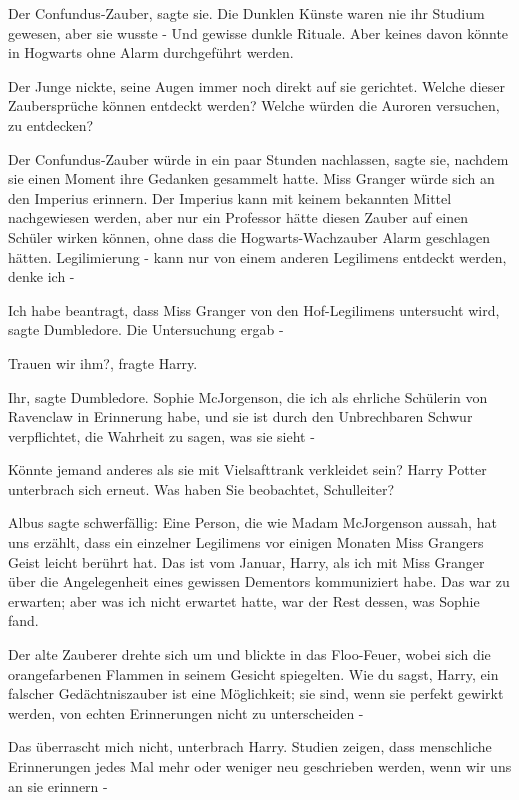 \glqq{}Der Confundus-Zauber\grqq{}, sagte sie. Die Dunklen Künste waren nie ihr
Studium gewesen, aber sie wusste - \glqq{}Und gewisse dunkle Rituale. Aber keines
davon könnte in Hogwarts ohne Alarm durchgeführt werden.\grqq{}

Der Junge nickte, seine Augen immer noch direkt auf sie gerichtet. \glqq{}Welche
dieser Zaubersprüche können entdeckt werden? Welche würden die Auroren
versuchen, zu entdecken?\grqq{}

\glqq{}Der Confundus-Zauber würde in ein paar Stunden nachlassen\grqq{}, sagte
sie, nachdem sie einen Moment ihre Gedanken gesammelt hatte. \glqq{}Miss Granger
würde sich an den Imperius erinnern. Der Imperius kann mit keinem bekannten
Mittel nachgewiesen werden, aber nur ein Professor hätte diesen Zauber auf einen
Schüler wirken können, ohne dass die Hogwarts-Wachzauber Alarm geschlagen
hätten. Legilimierung - kann nur von einem anderen Legilimens entdeckt werden,
denke ich -\grqq{}

\glqq{}Ich habe beantragt, dass Miss Granger von den Hof-Legilimens untersucht
wird\grqq{}, sagte Dumbledore. \glqq{}Die Untersuchung ergab -\grqq{}

\glqq{}Trauen wir ihm?\grqq{}, fragte Harry.

\glqq{}Ihr\grqq{}, sagte Dumbledore. \glqq{}Sophie McJorgenson, die ich als
ehrliche Schülerin von Ravenclaw in Erinnerung habe, und sie ist durch den
Unbrechbaren Schwur verpflichtet, die Wahrheit zu sagen, was sie sieht -\grqq{}

\glqq{}Könnte jemand anderes als sie mit Vielsafttrank verkleidet sein?\grqq{}
Harry Potter unterbrach sich erneut. \glqq{}Was haben Sie beobachtet,
Schulleiter?\grqq{}

Albus sagte schwerfällig: \glqq{}Eine Person, die wie Madam McJorgenson aussah,
hat uns erzählt, dass ein einzelner Legilimens vor einigen Monaten Miss Grangers
Geist leicht berührt hat. Das ist vom Januar, Harry, als ich mit Miss Granger
über die Angelegenheit eines gewissen Dementors kommuniziert habe. Das war zu
erwarten; aber was ich nicht erwartet hatte, war der Rest dessen, was Sophie
fand.\grqq{}

Der alte Zauberer drehte sich um und blickte in das Floo-Feuer, wobei sich die
orangefarbenen Flammen in seinem Gesicht spiegelten. \glqq{}Wie du sagst, Harry,
ein falscher Gedächtniszauber ist eine Möglichkeit; sie sind, wenn sie perfekt
gewirkt werden, von echten Erinnerungen nicht zu unterscheiden -\grqq{}

\glqq{}Das überrascht mich nicht\grqq{}, unterbrach Harry. \glqq{}Studien zeigen,
dass menschliche Erinnerungen jedes Mal mehr oder weniger neu geschrieben
werden, wenn wir uns an sie erinnern -\grqq{}

